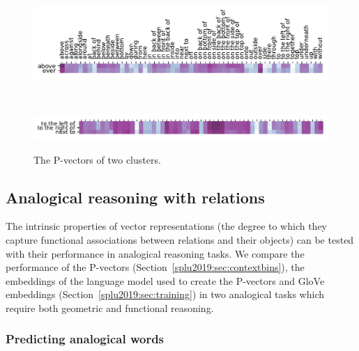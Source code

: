 \begin{figure}
  \begin{center}
    \begin{minipage}{\linewidth}
      \begin{center}
        \hfill
        \includegraphics[scale=0.6]{studies/splu2019/figures/above-over.pdf} \\
      \end{center}
    \end{minipage}\\
    \begin{minipage}{\linewidth}
      \begin{center}
        \hfill
        \includegraphics[scale=0.6]{studies/splu2019/figures/left-right.pdf} \\
      \end{center}
    \end{minipage}%
  \caption{The P-vectors of two clusters.
  }
  \label{splu2019:fig:clusters}
\end{center}
\vspace{-5mm}
\end{figure}

\subsection{Analogical reasoning with relations}\label{splu2019:sec:alanogical}
The intrinsic properties of vector representations (the degree to which they
capture functional associations between relations and their objects) can be
tested with their performance in analogical reasoning tasks.
We compare the performance of the P-vectors (Section~\ref{splu2019:sec:contextbins}),
the embeddings of the language model used to create the P-vectors and GloVe
embeddings (Section~\ref{splu2019:sec:training}) in two
analogical tasks which require both geometric and functional reasoning.

\subsubsection{Predicting analogical words}

